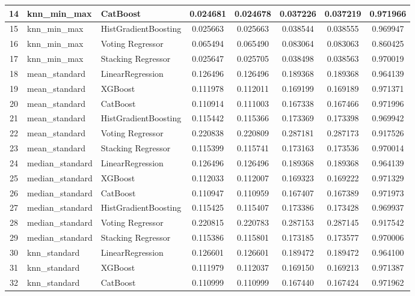 \documentclass[10pt,letterpaper]{article}
\begin{document}
\begin{landscape}
\begin{table}[H]
\begin{tabular}{|c|l|l|c|c|c|c|c|}
14 & knn\_min\_max & CatBoost & 0.024681 & 0.024678 & 0.037226 & 0.037219 & 0.971966 \\ \hline
15 & knn\_min\_max & HistGradientBoosting & 0.025663 & 0.025663 & 0.038544 & 0.038555 & 0.969947 \\ \hline
16 & knn\_min\_max & Voting Regressor & 0.065494 & 0.065490 & 0.083064 & 0.083063 & 0.860425 \\ \hline
17 & knn\_min\_max & Stacking Regressor & 0.025647 & 0.025705 & 0.038498 & 0.038563 & 0.970019 \\ \hline
18 & mean\_standard & LinearRegression & 0.126496 & 0.126496 & 0.189368 & 0.189368 & 0.964139 \\ \hline
19 & mean\_standard & XGBoost & 0.111978 & 0.112011 & 0.169199 & 0.169189 & 0.971371 \\ \hline
20 & mean\_standard & CatBoost & 0.110914 & 0.111003 & 0.167338 & 0.167466 & 0.971996 \\ \hline
21 & mean\_standard & HistGradientBoosting & 0.115442 & 0.115366 & 0.173369 & 0.173398 & 0.969942 \\ \hline
22 & mean\_standard & Voting Regressor & 0.220838 & 0.220809 & 0.287181 & 0.287173 & 0.917526 \\ \hline
23 & mean\_standard & Stacking Regressor & 0.115399 & 0.115741 & 0.173163 & 0.173536 & 0.970014 \\ \hline
24 & median\_standard & LinearRegression & 0.126496 & 0.126496 & 0.189368 & 0.189368 & 0.964139 \\ \hline
25 & median\_standard & XGBoost & 0.112033 & 0.112007 & 0.169323 & 0.169222 & 0.971329 \\ \hline
26 & median\_standard & CatBoost & 0.110947 & 0.110959 & 0.167407 & 0.167389 & 0.971973 \\ \hline
27 & median\_standard & HistGradientBoosting & 0.115425 & 0.115407 & 0.173386 & 0.173428 & 0.969937 \\ \hline
28 & median\_standard & Voting Regressor & 0.220815 & 0.220783 & 0.287153 & 0.287145 & 0.917542 \\ \hline
29 & median\_standard & Stacking Regressor & 0.115386 & 0.115801 & 0.173185 & 0.173577 & 0.970006 \\ \hline
30 & knn\_standard & LinearRegression & 0.126601 & 0.126601 & 0.189472 & 0.189472 & 0.964100 \\ \hline
31 & knn\_standard & XGBoost & 0.111979 & 0.112037 & 0.169150 & 0.169213 & 0.971387 \\ \hline
32 & knn\_standard & CatBoost & 0.110999 & 0.110999 & 0.167440 & 0.167424 & 0.971962 \\ \hline

\end{tabular}
\end{table}
\end{landscape}
\end{document}
